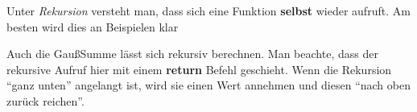 \documentclass[c_worksheet.tex]{subfiles}
\begin{document}
Unter \emph{Rekursion} versteht man, dass sich eine Funktion \textbf{selbst} wieder aufruft. Am besten wird dies an Beispielen klar



Auch die GaußSumme lässt sich rekursiv berechnen. Man beachte, dass der rekursive Aufruf hier mit einem \textbf{return} Befehl geschieht. Wenn die Rekursion ``ganz unten'' angelangt ist, wird sie einen Wert annehmen und diesen ``nach oben zurück reichen''.


 
\end{document}
